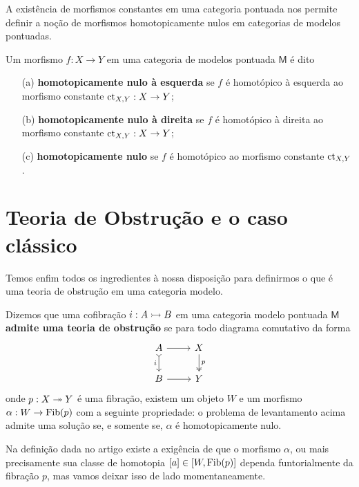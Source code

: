 A existência de morfismos constantes em uma categoria pontuada nos permite definir a noção de morfismos homotopicamente nulos em categorias de modelos pontuadas.

\begin{defin}
  Um morfismo $f: X \to Y$ em uma categoria de modelos pontuada $\mathsf{M}$ é dito
  \begin{enumerate}
  \item[(a)] \textbf{homotopicamente nulo à esquerda} se $f$ é homotópico à esquerda ao morfismo constante $\mathrm{ct}_{X,Y}: X \to Y$;
    
  \item[(b)] \textbf{homotopicamente nulo à direita} se $f$ é homotópico à direita ao morfismo constante $\mathrm{ct}_{X,Y}: X \to Y$;
    
  \item[(c)] \textbf{homotopicamente nulo} se $f$ é homotópico ao morfismo constante $\mathrm{ct}_{X,Y}$.
  \end{enumerate}
\end{defin}

\section{Teoria de Obstrução e o caso clássico}

Temos enfim todos os ingredientes à nossa disposição para definirmos o que é uma teoria de obstrução em uma categoria modelo.

\begin{defin}\label{defin:teoria_de_obstrucao_para_cofibracao}
  Dizemos que uma cofibração $i: A \rightarrowtail B$ em uma categoria modelo pontuada $\mathsf{M}$ \textbf{admite uma teoria de obstrução} se para todo diagrama comutativo da forma
  \begin{displaymath}
    \begin{tikzcd}
      A
      \arrow[d, tail, "i" swap]
      \arrow[r]
      & X
      \arrow[d, two heads, "p"]
      \\ B
      \arrow[r]
      & Y
    \end{tikzcd}
  \end{displaymath}
  onde $p: X \twoheadrightarrow Y$ é uma fibração, existem um objeto $W$ e um morfismo $\alpha: W \to \mathrm{Fib}(p)$ com a seguinte propriedade: o problema de levantamento acima admite uma solução se, e somente se, $\alpha$ é homotopicamente nulo.
\end{defin}

\begin{obs}
  Na definição dada no artigo existe a exigência de que o morfismo $\alpha$, ou mais precisamente sua classe de homotopia $[a] \in [W,\mathrm{Fib}(p)]$ dependa funtorialmente da fibração $p$, mas vamos deixar isso de lado momentaneamente.
\end{obs}

